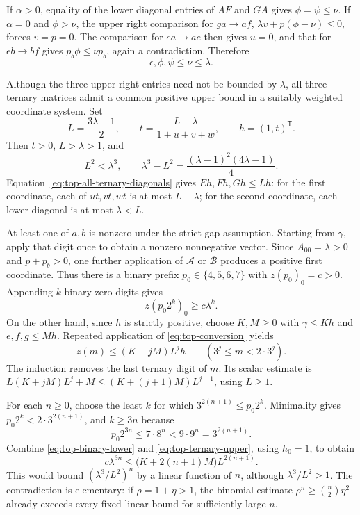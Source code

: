 \documentclass[11pt,a4paper]{article}
\begin{document}
If $\alpha>0$, equality of the lower diagonal entries of $AF$ and
$GA$ gives $\phi=\psi\le\nu$. If $\alpha=0$ and $\phi>\nu$,
the upper right comparison for $ga\to af$,
$\lambda v+p(\phi-\nu)\le0$, forces $v=p=0$.
The comparison for $ea\to ae$ then gives $u=0$, and that for
$eb\to bf$ gives $p_b\phi\le\nu p_b$, again a contradiction.
Therefore
\begin{equation}\label{eq:top-all-ternary-diagonals}
\epsilon,\phi,\psi\le\nu\le\lambda.
\end{equation}

Although the three upper right entries need not be bounded by
$\lambda$, all three ternary matrices admit a common positive
upper bound in a suitably weighted coordinate system. Set
\begin{equation}\label{eq:top-upper-ray}
L=\frac{3\lambda-1}{2},\qquad
t=\frac{L-\lambda}{1+u+v+w},\qquad h=(1,t)^{\mathsf T}.
\end{equation}
Then $t>0$, $L>\lambda>1$, and
\[
L^2<\lambda^3,
\qquad
\lambda^3-L^2=\frac{(\lambda-1)^2(4\lambda-1)}4.
\]
Equation~\eqref{eq:top-all-ternary-diagonals} gives
$Eh,Fh,Gh\le Lh$: for the first coordinate, each of
$ut,vt,wt$ is at most $L-\lambda$; for the second coordinate,
each lower diagonal is at most $\lambda<L$.

At least one of $a,b$ is nonzero under the strict-gap assumption.
Starting from $\gamma$, apply that digit once to obtain a nonzero
nonnegative vector. Since $A_{00}=\lambda>0$ and $p+p_b>0$,
one further application of $\mathcal A$ or $\mathcal B$ produces
a positive first coordinate. Thus there is a binary prefix
$p_0\in\{4,5,6,7\}$ with $z(p_0)_0=c>0$.
Appending $k$ binary zero digits gives
\begin{equation}\label{eq:top-binary-lower}
z(p_0 2^k)_0\ge c\lambda^k.
\end{equation}
On the other hand, since $h$ is strictly positive, choose $K,M\ge0$
with $\gamma\le Kh$ and $e,f,g\le Mh$.
Repeated application of \eqref{eq:top-conversion} yields
\begin{equation}\label{eq:top-ternary-upper}
z(m)\le(K+jM)L^jh\qquad(3^j\le m<2\cdot3^j).
\end{equation}
The induction removes the last ternary digit of $m$.
Its scalar estimate is
$L(K+jM)L^j+M\le(K+(j+1)M)L^{j+1}$, using $L\ge1$.

For each $n\ge0$, choose the least $k$ for which
$3^{2(n+1)}\le p_0 2^k$. Minimality gives
$p_0 2^k<2\cdot3^{2(n+1)}$, and $k\ge3n$ because
\[
p_0 2^{3n}\le7\cdot8^n<9\cdot9^n=3^{2(n+1)}.
\]
Combine \eqref{eq:top-binary-lower} and
\eqref{eq:top-ternary-upper}, using $h_0=1$, to obtain
\[
c\lambda^{3n}\le\bigl(K+2(n+1)M\bigr)L^{2(n+1)}.
\]
This would bound $(\lambda^3/L^2)^n$ by a linear function of $n$,
although $\lambda^3/L^2>1$. The contradiction is elementary:
if $\rho=1+\eta>1$, the binomial estimate
$\rho^n\ge\binom n2\eta^2$ already exceeds every fixed linear
bound for sufficiently large $n$.
\end{document}
